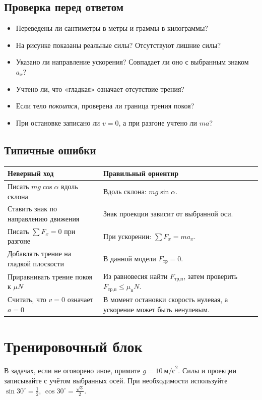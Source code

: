 \documentclass[a4paper,12pt]{article}
\newcommand{\sectionline}[1]{\section*{\textcolor{darkaccent}{#1}}}
\newcommand{\subhead}[1]{\subsection*{\textcolor{darkaccent}{#1}}}
\begin{document}
\subhead{Проверка перед ответом}
\begin{itemize}
\item Переведены ли сантиметры в метры и граммы в килограммы?
\item На рисунке показаны реальные силы? Отсутствуют лишние силы?
\item Указано ли направление ускорения? Совпадает ли оно с выбранным знаком $a_x$?
\item Учтено ли, что «гладкая» означает отсутствие трения?
\item Если тело \emph{покоится}, проверена ли граница трения покоя?
\item При остановке записано ли $v=0$, а при разгоне учтено ли $ma$?
\end{itemize}
\subhead{Типичные ошибки}
\begin{tabularx}{\linewidth}{@{}p{64mm}X@{}}
\toprule
\textbf{Неверный ход} & \textbf{Правильный ориентир} \\ \midrule
Писать $mg\cos\alpha$ вдоль склона & Вдоль склона: $mg\sin\alpha$. \\
Ставить знак по направлению движения & Знак проекции зависит от выбранной оси. \\
Писать $\sum F_x=0$ при разгоне & При ускорении: $\sum F_x=ma_x$. \\
Добавлять трение на гладкой плоскости & В данной модели $F_{\text{тр}}=0$. \\
Приравнивать трение покоя к $\mu N$ & Из равновесия найти $F_{\text{тр,п}}$, затем проверить $F_{\text{тр,п}}\le\mu_{\text{п}}N$. \\
Считать, что $v=0$ означает $a=0$ & В момент остановки скорость нулевая, а ускорение может быть ненулевым. \\
\bottomrule
\end{tabularx}

\clearpage
\sectionline{Тренировочный блок}
В задачах, если не оговорено иное, примите $g=10\ \text{м/с}^2$. Силы и проекции записывайте с учётом выбранных осей. При необходимости используйте $\sin30^\circ=\tfrac12$, $\cos30^\circ=\tfrac{\sqrt3}{2}$.
\end{document}
